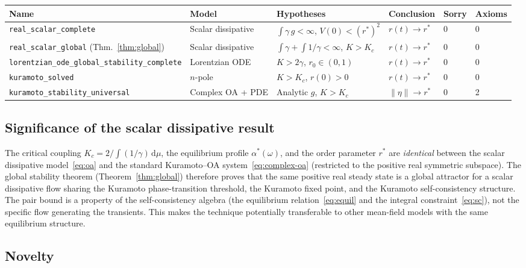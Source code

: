 \documentclass[11pt,a4paper]{article}
\theoremstyle{definition}
\begin{document}
\begin{center}
\small
\begin{tabular}{llllll}
\textbf{Name} & \textbf{Model} & \textbf{Hypotheses} & \textbf{Conclusion} & \textbf{Sorry} & \textbf{Axioms} \\
\hline
\texttt{real\_scalar\_complete} & Scalar dissipative & $\int\gamma\,g < \infty$, $V(0) < (r^*)^2$ & $r(t) \to r^*$ & 0 & 0 \\
\texttt{real\_scalar\_global} (Thm.~\ref{thm:global}) & Scalar dissipative & $\int\gamma + \int 1/\gamma < \infty$, $K > K_c$ & $r(t) \to r^*$ & 0 & 0 \\
\texttt{lorentzian\_ode\_global\_stability\_complete} & Lorentzian ODE & $K > 2\gamma$, $r_0 \in (0,1)$ & $r(t) \to r^*$ & 0 & 0 \\
\texttt{kuramoto\_solved} & $n$-pole & $K > K_c$, $r(0) > 0$ & $r(t) \to r^*$ & 0 & 0 \\
\texttt{kuramoto\_stability\_universal} & Complex OA + PDE & Analytic $g$, $K > K_c$ & $\|\eta\| \to r^*$ & 0 & 2 \\
\end{tabular}
\end{center}

\subsection{Significance of the scalar dissipative result}

The critical coupling $K_c = 2/\int(1/\gamma)\,\mathrm{d}\mu$, the equilibrium profile $\alpha^*(\omega)$, and the order parameter $r^*$ are \emph{identical} between the scalar dissipative model~\eqref{eq:oa} and the standard Kuramoto--OA system~\eqref{eq:complex-oa} (restricted to the positive real symmetric subspace). The global stability theorem (Theorem~\ref{thm:global}) therefore proves that the same positive real steady state is a global attractor for a scalar dissipative flow sharing the Kuramoto phase-transition threshold, the Kuramoto fixed point, and the Kuramoto self-consistency structure. The pair bound is a property of the self-consistency algebra (the equilibrium relation~\eqref{eq:equil} and the integral constraint~\eqref{eq:sc}), not the specific flow generating the transients. This makes the technique potentially transferable to other mean-field models with the same equilibrium structure.

\subsection{Novelty}
\end{document}
